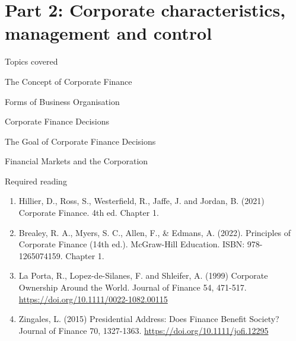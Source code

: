 \documentclass[9pt,aspectratio=169]{beamer}
\newenvironment{wideitemize}{\itemize\addtolength{\itemsep}{10pt}}{\enditemize}
\begin{document}
\newcommand{\partbsource}[1]{\par\vspace{0.5em}{\footnotesize #1\par}}


\section[Part 2: Corporate characteristics, management and control]{\textbf{Part 2: Corporate characteristics, management and control}}

\begin{frame}{Topics covered} 
\begin{wideitemize}
    \item The Concept of Corporate Finance
\item Forms of Business Organisation
\item Corporate Finance Decisions
\item The Goal of Corporate Finance Decisions
\item Financial Markets and the Corporation
\end{wideitemize}

\end{frame}


\begin{frame}{Required reading}
\begin{enumerate}
\item Hillier, D., Ross, S., Westerfield, R., Jaffe, J. and Jordan, B. (2021)
Corporate Finance. 4th ed. Chapter 1.
\item  Brealey, R. A., Myers, S. C., Allen, F., \& Edmans, A. (2022). Principles of Corporate Finance (14th ed.). McGraw-Hill Education. ISBN: 978-1265074159. Chapter 1.
\item  La Porta, R., Lopez-de-Silanes, F. and Shleifer, A. (1999) Corporate
Ownership Around the World. Journal of Finance 54, 471-517.
\href{https://doi.org/10.1111/0022-1082.00115}{https://doi.org/10.1111/0022-1082.00115}
\item  Zingales, L. (2015) Presidential Address: Does Finance Benefit
Society? Journal of Finance 70, 1327-1363.
\href{https://doi.org/10.1111/jofi.12295}{https://doi.org/10.1111/jofi.12295}
\end{enumerate}
\end{frame}
\end{document}
